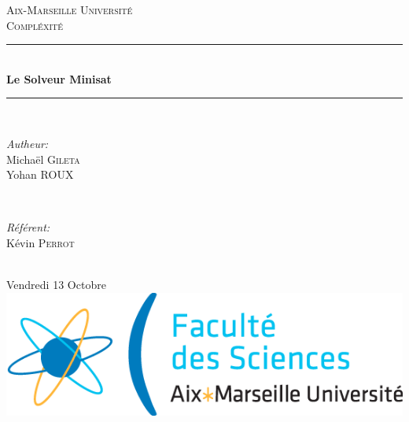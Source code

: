 \documentclass[12pt]{report}
\begin{document}
\begin{titlepage}
\vspace*{\fill}
\newcommand{\HRule}{\rule{\linewidth}{0.5mm}}

\center

\textsc{\LARGE Aix-Marseille Université}\\[1.5cm]
\textsc{\Large Compléxité}\\[0.5cm]

\HRule \\[0.4cm]
{ \huge \bfseries Le Solveur Minisat}\\[0.4cm] %
\HRule \\[1.5cm]

\begin{minipage}{0.4\textwidth}
\begin{flushleft} \large
\emph{Autheur:}\\
Michaël \textsc{Gileta} \\
Yohan \textsc{ROUX}
\end{flushleft}
\end{minipage}
~
\begin{minipage}{0.4\textwidth}
\begin{flushright} \large
\emph{Référent:} \\
Kévin \textsc{Perrot}
\end{flushright}
\end{minipage}\\[2cm]

{\large Vendredi 13 Octobre}\\[2cm]

\includegraphics[scale=0.5]{./images/logo.png}\\[1cm]

\vspace*{\fill}
\end{titlepage}

\end{document}

